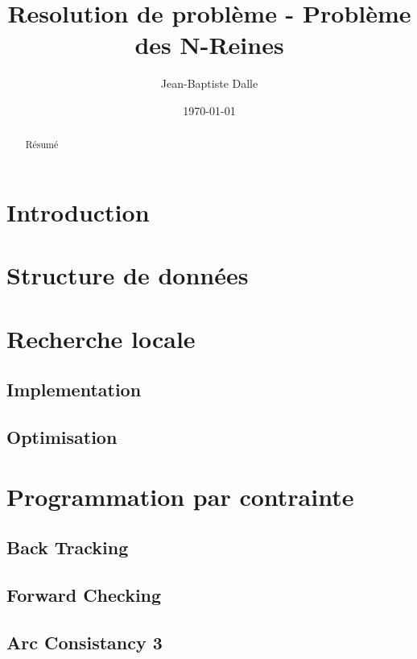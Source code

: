 \documentclass[a4paper,10pt]{article}
\title{Resolution de problème - Problème des N-Reines}
\author{Jean-Baptiste Dalle}
\date{\today}
\begin{document}
\maketitle

\newpage

\tableofcontents

\newpage

\begin{abstract}

Résumé

\end{abstract}

\section{Introduction}

\section{Structure de données}

\section{Recherche locale}

\subsection{Implementation}

\subsection{Optimisation}

\section{Programmation par contrainte}

\subsection{Back Tracking}

\subsection{Forward Checking}

\subsection{Arc Consistancy 3}
\end{document}
